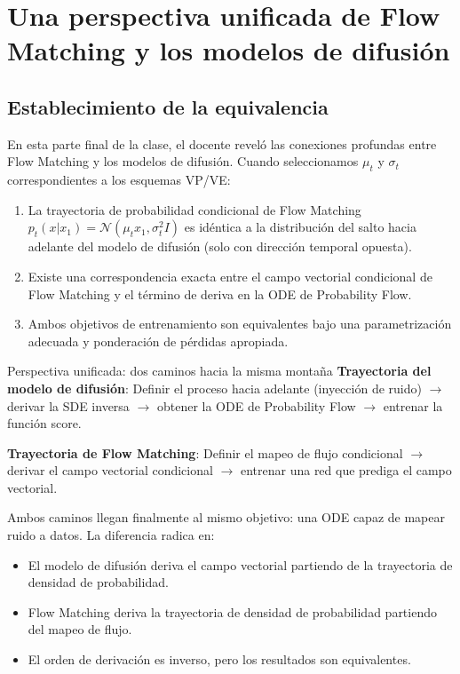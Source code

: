 \section{Una perspectiva unificada de Flow Matching y los modelos de difusión}

\subsection{Establecimiento de la equivalencia}

En esta parte final de la clase, el docente reveló las conexiones profundas entre Flow Matching y los modelos de difusión. Cuando seleccionamos $\mu_t$ y $\sigma_t$ correspondientes a los esquemas VP/VE:

\begin{enumerate}
    \item La trayectoria de probabilidad condicional de Flow Matching $p_t(x | x_1) = \mathcal{N}(\mu_t x_1, \sigma_t^2 I)$ es idéntica a la distribución del salto hacia adelante del modelo de difusión (solo con dirección temporal opuesta).
    \item Existe una correspondencia exacta entre el campo vectorial condicional de Flow Matching y el término de deriva en la ODE de Probability Flow.
    \item Ambos objetivos de entrenamiento son equivalentes bajo una parametrización adecuada y ponderación de pérdidas apropiada.
\end{enumerate}

\begin{importantbox}{Perspectiva unificada: dos caminos hacia la misma montaña}
\textbf{Trayectoria del modelo de difusión}: Definir el proceso hacia adelante (inyección de ruido) $\to$ derivar la SDE inversa $\to$ obtener la ODE de Probability Flow $\to$ entrenar la función score.

\textbf{Trayectoria de Flow Matching}: Definir el mapeo de flujo condicional $\to$ derivar el campo vectorial condicional $\to$ entrenar una red que prediga el campo vectorial.

Ambos caminos llegan finalmente al mismo objetivo: una ODE capaz de mapear ruido a datos. La diferencia radica en:
\begin{itemize}
    \item El modelo de difusión deriva el campo vectorial partiendo de la trayectoria de densidad de probabilidad.
    \item Flow Matching deriva la trayectoria de densidad de probabilidad partiendo del mapeo de flujo.
    \item El orden de derivación es inverso, pero los resultados son equivalentes.
\end{itemize}
\end{importantbox}

